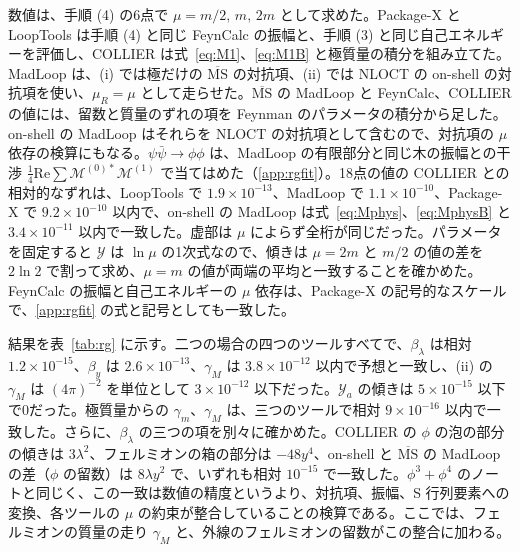 \documentclass[a4paper,10pt]{ltjsarticle}
\newcommand{\MSbar}{\overline{\mathrm{MS}}}
\begin{document}
数値は、手順 (4) の6点で $\mu=m/2,\,m,\,2m$ として求めた。Package-X と LoopTools は手順 (4) と同じ FeynCalc の振幅と、手順 (3) と同じ自己エネルギーを評価し、COLLIER は式~\eqref{eq:M1}、\eqref{eq:M1B} と極質量の積分を組み立てた。MadLoop は、(i) では極だけの $\MSbar$ の対抗項、(ii) では NLOCT の on-shell の対抗項を使い、$\mu_R=\mu$ として走らせた。$\MSbar$ の MadLoop と FeynCalc、COLLIER の値には、留数と質量のずれの項を Feynman のパラメータの積分から足した。on-shell の MadLoop はそれらを NLOCT の対抗項として含むので、対抗項の $\mu$ 依存の検算にもなる。$\psi\bar\psi\to\phi\phi$ は、MadLoop の有限部分と同じ木の振幅との干渉 $\frac14\mathrm{Re}\sum\mathcal M^{(0)*}\mathcal M^{(1)}$ で当てはめた（\ref{app:rgfit}）。18点の値の COLLIER との相対的なずれは、LoopTools で $1.9\times10^{-13}$、MadLoop で $1.1\times10^{-10}$、Package-X で $9.2\times10^{-10}$ 以内で、on-shell の MadLoop は式~\eqref{eq:Mphys}、\eqref{eq:MphysB} と $3.4\times10^{-11}$ 以内で一致した。虚部は $\mu$ によらず全桁が同じだった。パラメータを固定すると $\mathcal Y$ は $\ln\mu$ の1次式なので、傾きは $\mu=2m$ と $m/2$ の値の差を $2\ln2$ で割って求め、$\mu=m$ の値が両端の平均と一致することを確かめた。FeynCalc の振幅と自己エネルギーの $\mu$ 依存は、Package-X の記号的なスケールで、\ref{app:rgfit} の式と記号としても一致した。

結果を表~\ref{tab:rg} に示す。二つの場合の四つのツールすべてで、$\beta_\lambda$ は相対 $1.2\times10^{-15}$、$\beta_y$ は $2.6\times10^{-13}$、$\gamma_M$ は $3.8\times10^{-12}$ 以内で予想と一致し、(ii) の $\gamma_M$ は $(4\pi)^{-2}$ を単位として $3\times10^{-12}$ 以下だった。$\mathcal Y_a$ の傾きは $5\times10^{-15}$ 以下で0だった。極質量からの $\gamma_m$、$\gamma_M$ は、三つのツールで相対 $9\times10^{-16}$ 以内で一致した。さらに、$\beta_\lambda$ の三つの項を別々に確かめた。COLLIER の $\phi$ の泡の部分の傾きは $3\lambda^2$、フェルミオンの箱の部分は $-48y^4$、on-shell と $\MSbar$ の MadLoop の差（$\phi$ の留数）は $8\lambda y^2$ で、いずれも相対 $10^{-15}$ で一致した。$\phi^3+\phi^4$ のノートと同じく、この一致は数値の精度というより、対抗項、振幅、S 行列要素への変換、各ツールの $\mu$ の約束が整合していることの検算である。ここでは、フェルミオンの質量の走り $\gamma_M$ と、外線のフェルミオンの留数がこの整合に加わる。
\end{document}
